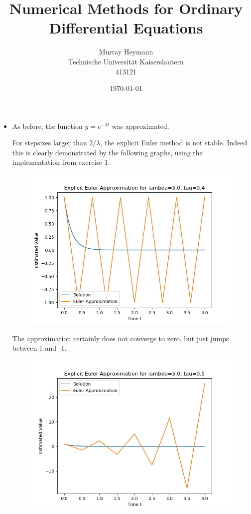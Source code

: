 \documentclass{article}
\title{Numerical Methods for Ordinary Differential Equations}
\author{Murray Heymann \\
	Technische Universit{\"a}t Kaiserslautern \\
	413121}
\date{\today}
\theoremstyle{definition}
\begin{document}
\maketitle


\setcounter{section}{2}
\section{}
\subsection{}

\begin{itemize}
	\item[(a)]
		As before, the function $y = e^{- \lambda t}$ was approximated.

		For stepsizes larger than $2/\lambda$, the explicit Euler method
		is not stable.  Indeed this is clearly demonstrated by the
		following graphs, using the implementation from exercise $1$.
		\begin{figure}[H]
			\includegraphics[scale=0.6]{explicit_euler_04}
		\end{figure}
		The approximation certainly does not
		converge to zero, but just jumps between 1 and -1.
		\begin{figure}[H]
			\includegraphics[scale=0.6]{explicit_euler_05}

\end{figure}
\end{itemize}
\end{document}
